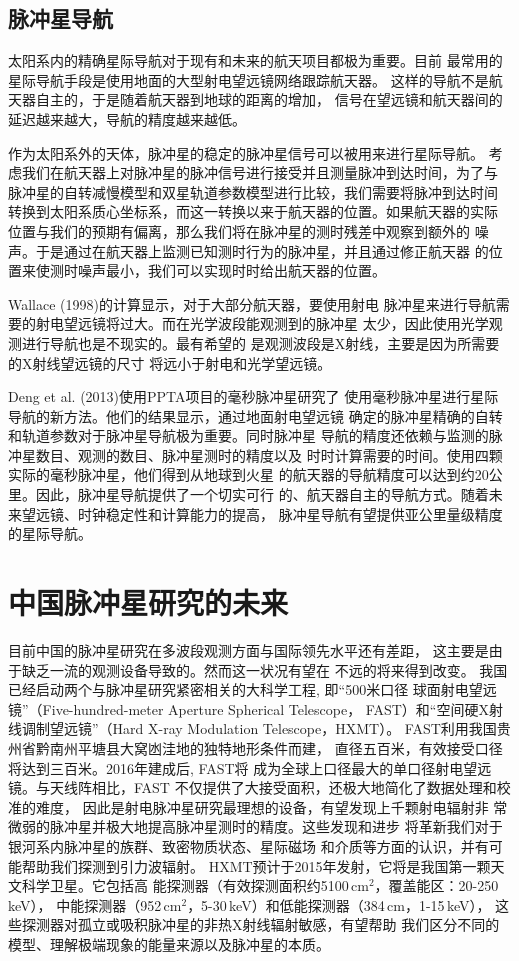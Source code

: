 \subsection{脉冲星导航}

太阳系内的精确星际导航对于现有和未来的航天项目都极为重要。目前
最常用的星际导航手段是使用地面的大型射电望远镜网络跟踪航天器。
这样的导航不是航天器自主的，于是随着航天器到地球的距离的增加，
信号在望远镜和航天器间的延迟越来越大，导航的精度越来越低。

作为太阳系外的天体，脉冲星的稳定的脉冲星信号可以被用来进行星际导航。
考虑我们在航天器上对脉冲星的脉冲信号进行接受并且测量脉冲到达时间，为了与
脉冲星的自转减慢模型和双星轨道参数模型进行比较，我们需要将脉冲到达时间
转换到太阳系质心坐标系，而这一转换以来于航天器的位置。如果航天器的实际
位置与我们的预期有偏离，那么我们将在脉冲星的测时残差中观察到额外的
噪声。于是通过在航天器上监测已知测时行为的脉冲星，并且通过修正航天器
的位置来使测时噪声最小，我们可以实现时时给出航天器的位置。

Wallace (1998)\supercite{wal88}的计算显示，对于大部分航天器，要使用射电
脉冲星来进行导航需要的射电望远镜将过大。而在光学波段能观测到的脉冲星
太少，因此使用光学观测进行导航也是不现实的\supercite{sg01}。最有希望的
是观测波段是X射线\supercite{cb81}，主要是因为所需要的X射线望远镜的尺寸
将远小于射电和光学望远镜\supercite{she05}。

Deng et al. (2013)\supercite{dhy+13}使用PPTA项目的毫秒脉冲星研究了
使用毫秒脉冲星进行星际导航的新方法。他们的结果显示，通过地面射电望远镜
确定的脉冲星精确的自转和轨道参数对于脉冲星导航极为重要。同时脉冲星
导航的精度还依赖与监测的脉冲星数目、观测的数目、脉冲星测时的精度以及
时时计算需要的时间。使用四颗实际的毫秒脉冲星，他们得到从地球到火星
的航天器的导航精度可以达到约20公里。因此，脉冲星导航提供了一个切实可行
的、航天器自主的导航方式。随着未来望远镜、时钟稳定性和计算能力的提高，
脉冲星导航有望提供亚公里量级精度的星际导航。

\section{中国脉冲星研究的未来}

目前中国的脉冲星研究在多波段观测方面与国际领先水平还有差距，
这主要是由于缺乏一流的观测设备导致的。然而这一状况有望在
不远的将来得到改变。
%
我国已经启动两个与脉冲星研究紧密相关的大科学工程, 即“500米口径
球面射电望远镜”（Five-hundred-meter Aperture Spherical Telescope，
FAST）和“空间硬X射线调制望远镜”（Hard X-ray Modulation Telescope，HXMT）。
FAST利用我国贵州省黔南州平塘县大窝凼洼地的独特地形条件而建，
直径五百米，有效接受口径将达到三百米。2016年建成后, FAST将
成为全球上口径最大的单口径射电望远镜。与天线阵相比，FAST
不仅提供了大接受面积，还极大地简化了数据处理和校准的难度，
因此是射电脉冲星研究最理想的设备，有望发现上千颗射电辐射非
常微弱的脉冲星并极大地提高脉冲星测时的精度。这些发现和进步
将革新我们对于银河系内脉冲星的族群、致密物质状态、星际磁场
和介质等方面的认识，并有可能帮助我们探测到引力波辐射。
HXMT预计于2015年发射，它将是我国第一颗天文科学卫星。它包括高
能探测器（有效探测面积约5100\,cm$^2$，覆盖能区：20-250\,keV），
中能探测器（952\,cm$^2$，5-30\,keV）和低能探测器（384\,cm，1-15\,keV），
这些探测器对孤立或吸积脉冲星的非热X射线辐射敏感，有望帮助
我们区分不同的模型、理解极端现象的能量来源以及脉冲星的本质。

